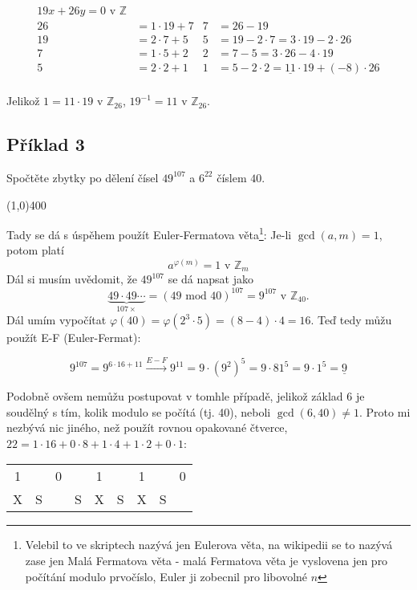 \documentclass{article}
\begin{document}
\begin{align*}
19x + 26y = 0 \mbox{ v } \mathbb{Z}&  	& 		&  \\
26 & = 1\cdot 19 + 7 					& 7		&= 26 - 19 \\
19 & = 2\cdot 7 + 5						& 5 	&= 19 - 2\cdot 7 = 3\cdot 19 - 2 \cdot 26 \\
7  & = 1\cdot 5 + 2						& 2 	&= 7 - 5 = 3\cdot 26 - 4 \cdot 19 \\
5  & = 2\cdot 2 + 1						& 1 	&= 5 - 2\cdot 2 = \underline{11}\cdot 19 + (-8) \cdot 26 \\
\end{align*}

Jelikož $1 = 11\cdot 19$ v $\mathbb{Z}_{26}$, $19^{-1} = 11$ v $\mathbb{Z}_{26}$.

\subsection{Příklad 3}
Spočtěte zbytky po dělení čísel $49^{107}$ a $6^{22}$ číslem $40$.

\line(1,0){400}

Tady se dá s úspěhem použít Euler-Fermatova věta\footnote{Velebil to ve skriptech nazývá jen Eulerova věta, na wikipedii se to nazývá zase jen Malá Fermatova věta - malá Fermatova věta je vyslovena jen pro počítání modulo prvočíslo, Euler ji zobecnil pro libovolné $n$}:
Je-li $\gcd(a,m) = 1$, potom platí
\begin{equation}
a^{\varphi(m)} = 1 \mbox{ v } \mathbb{Z}_m
\label{euler-fermat}
\end{equation}
Dál si musím uvědomit, že $49^{107}$ se dá napsat jako 
$$ \underbrace{49\cdot 49 \cdots}_{107 \times} = (49 \mbox{ mod } 40)^{107} = 9^{107} \mbox{ v } \mathbb{Z}_{40}.$$
Dál umím vypočítat $\varphi(40) = \varphi(2^3\cdot5) = (8-4)\cdot 4 = 16$. Teď tedy můžu použít E-F (Euler-Fermat):

$$9^{107} = 9^{6\cdot 16 + 11} \stackrel{E-F}{\rightarrow} 9^{11} = 9\cdot(9^2)^5 = 9\cdot{81^5} = 9\cdot 1^5 = \underline{9}$$

Podobně ovšem nemůžu postupovat v tomhle případě, jelikož základ 6 je soudělný s tím, kolik modulo se počítá (tj. 40), neboli $\gcd(6,40) \neq 1$. Proto mi nezbývá nic jiného, než použít rovnou opakované čtverce, $22 = 1\cdot16 + 0\cdot8 + 1\cdot4 + 1\cdot2 + 0\cdot1$:

\begin{center}  %
  \begin{tabular}{c|c|c|c|c|c|c|c|c}
		1 &   & 0 &   & 1 &   & 1 &   & 0\\ 
		X & S &   & S & X &	S & X & S &  \\
	\end{tabular}
\end{center}
\end{document}
